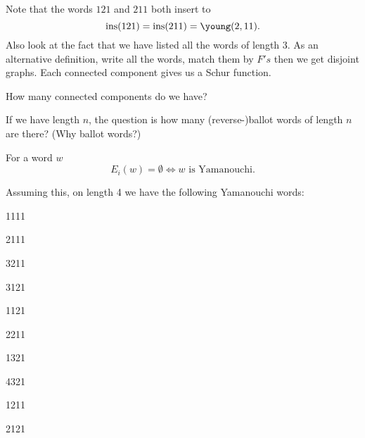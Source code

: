 \documentclass[12pt]{memoir}
\begin{document}
\begin{Ex}
\begin{center}

    \end{center}

    Note that the words $121$ and $211$ both insert to 
    $$\ins(121)=\ins(211)=\young(2,11).$$
    Also look at the fact that we have listed all the words of length $3$. As an alternative definition, write all the words, match them by $F's$ then we get disjoint graphs. Each connected component gives us a Schur function.
\end{Ex}

\begin{significant}
How many connected components do we have?
\end{significant}

If we have length $n$, the question is how many (reverse-)ballot words of length $n$ are there? (Why ballot words?)

\begin{Lem}[Homework]
    For a word $w$ 
    $$E_i(w)=\emptyset\iff w\text{ is Yamanouchi.}$$
\end{Lem}

Assuming this, on length 4 we have the following Yamanouchi words: 
\begin{enumerate}
\begin{multicols}{3}
    \item 1111
    \item 2111
    \item 3211
    \item 3121
    \item 1121
    \item 2211
    \item 1321
    \item 4321
    \item 1211
    \item 2121
\end{multicols}
\end{enumerate}
\end{document}
